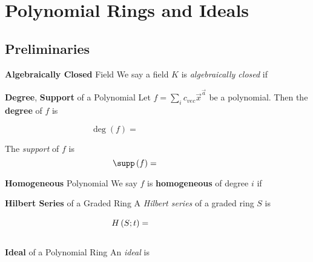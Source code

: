 \documentclass[11pt]{article}
\begin{document}
    
    \section{Polynomial Rings and Ideals}

    \subsection{Preliminaries}

    \begin{definition}{\textbf{Algebraically Closed} Field}
        We say a field $K$ is \emph{algebraically closed} if 
    \end{definition}

    \begin{definition}{\textbf{Degree}, \textbf{Support} of a Polynomial}
        Let $f = \sum^{}_{i}c_{vec}\vec{x}^{\vec{a}}$ be a polynomial. Then the \textbf{degree} of $f$ is
        \begin{equation*}
            \deg\left( f \right) = \phantom{\max\left\lbrace \sum^{}_{i}a_i: c_{\vec{a}}\neq 0 \right\rbrace}
        \end{equation*}
        The \emph{support} of $f$ is
        \begin{equation*}
            \supp\left( f \right) = \phantom{\left\lbrace \vec{a}: c_{\vec{a}}\neq 0 \right\rbrace}
        \end{equation*}
    \end{definition}

    \begin{definition}{\textbf{Homogeneous} Polynomial}
        We say $f$ is \textbf{homogeneous} of degree $i$ if 
    \end{definition}

    \begin{definition}{\textbf{Hilbert Series} of a Graded Ring}
        A \emph{Hilbert series} of a graded ring $S$ is
        \begin{equation*}
            H\left( S;t \right) = \phantom{\sum^{}_{i\in\N} \dim\left( S_i \right) t^i}
        \end{equation*}
    \end{definition}

    \begin{definition}{\textbf{Ideal} of a Polynomial Ring}
        An \emph{ideal} is 
        \begin{equation*}
        \end{equation*}
    \end{definition}
    
\end{document}
